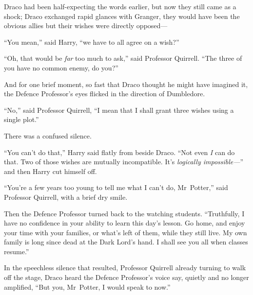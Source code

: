 Draco had been half-expecting the words earlier, but now they still came as a
shock; Draco exchanged rapid glances with Granger, they would have been the
obvious allies but their wishes were directly opposed—

“You mean,” said Harry, “we have to all agree on a wish?”

“Oh, that would be \emph{far} too much to ask,” said Professor Quirrell. “The
three of you have no common enemy, do you?”

And for one brief moment, so fast that Draco thought he might have imagined it,
the Defence Professor’s eyes flicked in the direction of Dumbledore.

“No,” said Professor Quirrell, “I mean that I shall grant three wishes using a
single plot.”

There was a confused silence.

“You can’t do that,” Harry said flatly from beside Draco. “Not even \emph{I}
can do that. Two of those wishes are mutually incompatible. It’s
\emph{logically impossible—}” and then Harry cut himself off.

“You’re a few years too young to tell me what I can’t do, Mr~Potter,” said
Professor Quirrell, with a brief dry smile.

Then the Defence Professor turned back to the watching students. “Truthfully, I
have no confidence in your ability to learn this day’s lesson. Go home, and
enjoy your time with your families, or what’s left of them, while they still
live. My own family is long since dead at the Dark Lord’s hand. I shall see you
all when classes resume.”

In the speechless silence that resulted, Professor Quirrell already turning to
walk off the stage, Draco heard the Defence Professor’s voice say, quietly and
no longer amplified, “But you, Mr~Potter, I would speak to now.”
